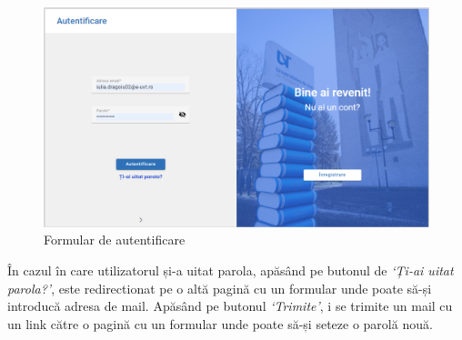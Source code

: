 \documentclass[12pt,a4paper]{report}
\theoremstyle{definition}
\theoremstyle{remark}
\begin{document}
\begin{figure}[H]
    \centering
    \includegraphics[width=1\linewidth]{resurse/ghid_utilizare/login.png}
    \caption{Formular de autentificare}
\end{figure}


\par În cazul în care utilizatorul și-a uitat parola, apăsând pe butonul de \textit{`Ți-ai uitat parola?'}, este redirectionat pe o altă pagină cu un formular unde poate să-și introducă adresa de mail. Apăsând pe butonul \textit{`Trimite'}, i se trimite un mail cu un link către o pagină cu un formular unde poate să-și seteze o parolă nouă.
\end{document}

